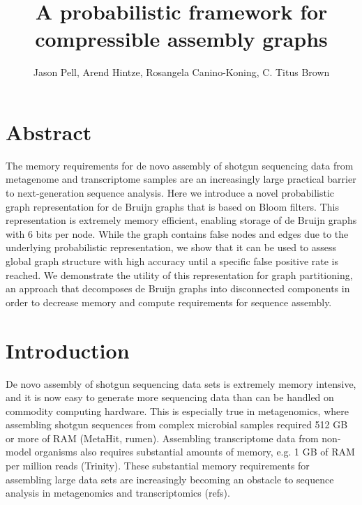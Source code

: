 \documentclass[12pt]{article} \usepackage{simplemargins}
\begin{document}
\title{A probabilistic framework for compressible assembly graphs}
\author{Jason Pell, Arend Hintze, Rosangela Canino-Koning, C. Titus Brown}

\maketitle

\section{Abstract}

The memory requirements for de novo assembly of shotgun sequencing
data from metagenome and transcriptome samples are an increasingly
large practical barrier to next-generation sequence analysis.  Here we
introduce a novel probabilistic graph representation for de Bruijn
graphs that is based on Bloom filters.  This representation is
extremely memory efficient, enabling storage of de Bruijn graphs with
6 bits per node.  While the graph contains false nodes and
edges due to the underlying probabilistic representation, we show that
it can be used to assess global graph structure with high accuracy
until a specific false positive rate is reached.  We demonstrate the
utility of this representation for graph partitioning, an approach
that decomposes de Bruijn graphs into disconnected components in order
to decrease memory and compute requirements for sequence assembly.


\section{Introduction}

De novo assembly of shotgun sequencing data sets is extremely memory
intensive, and it is now easy to generate more sequencing data than
can be handled on commodity computing hardware.  This is especially
true in metagenomics, where assembling shotgun sequences
from complex microbial samples required 512 GB or more of RAM
(MetaHit, rumen).  Assembling transcriptome data from non-model
organisms also requires substantial amounts of memory, e.g. 1 GB of
RAM per million reads (Trinity).  These substantial memory requirements for
assembling large data sets are increasingly becoming an obstacle to
sequence analysis in metagenomics and transcriptomics (refs).
\end{document}
